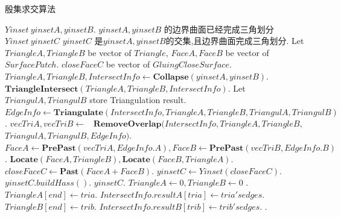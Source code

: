 \documentclass[a4paper]{book}
\renewcommand{\algorithmicrequire}{\textbf{输入:}}
\renewcommand{\algorithmicensure}{\textbf{输出:}}
\renewcommand{\algorithmicrequire}{\textbf{Input : }}
\renewcommand{\algorithmicrequire}{\textbf{Precondition : }}
\renewcommand{\algorithmicensure}{\textbf{Output : }}
\renewcommand{\algorithmicensure}{\textbf{Postcondition : }}
\numberwithin{equation}{chapter}
\theoremstyle{definition}
\begin{document}
\begin{algorithm}  
	\caption{殷集求交算法}  
	\label{alg:1}
	\begin{algorithmic}[1] %
		\renewcommand{\algorithmicrequire}{\textbf{Input : }}
		\Require $Yinset\ yinsetA,yinsetB$.
		\renewcommand{\algorithmicrequire}{\textbf{Precondition : }}
		\Require $yinsetA,yinsetB$ 的边界曲面已经完成三角划分
		\renewcommand{\algorithmicensure}{\textbf{Output : }}
		\Ensure $Yinset\ yinsetC$
		\renewcommand{\algorithmicensure}{\textbf{Postcondition : }}
		\Ensure $yinsetC$ 是$yinsetA,yinsetB$的交集,且边界曲面完成三角划分.
		\State Let $TriangleA,TriangleB$ be vector of $Triangle$, 
		\State $FaceA,FaceB$ be vector of $SurfacePatch$.
		$closeFaceC$ be vector of $GluingCloseSurface$.
		\State $TriangleA,TriangleB,IntersectInfo \gets \textbf{Collapse}(yinsetA,yinsetB)$. 
		\State $\textbf{TriangleIntersect}(TriangleA,TriangleB,IntersectInfo)$.
		\State Let $TriangulA,TriangulB$ store Triangulation  result.
		\State $EdgeInfo \gets \textbf{Triangulate}(IntersectInfo,TriangleA,TriangleB,TriangulA,TriangulB)$.
		\State $vecTriA,vecTriB  \gets $
		\Statex \quad \  $\textbf{RemoveOverlap}(IntersectInfo,TriangleA,TriangleB,$
		$TriangulA,TriangulB,EdgeInfo)$.
		\State $FaceA \gets \textbf{PrePast}(vecTriA,EdgeInfo.A), 
		FaceB \gets \textbf{PrePast}(vecTriB,EdgeInfo.B)$.
		\State $\textbf{Locate}(FaceA,TriangleB),\textbf{Locate}(FaceB,TriangleA)$.
		\State $closeFaceC \gets \textbf{Past}(FaceA + FaceB)$.
		\State $yinsetC \gets Yinset(closeFaceC)$. 
		\State $yinsetC.buildHass()$.
		\State \Return $yinsetC$. 
		\EndFunction
		\State
		\State $TriangleA \gets 0, TriangleB \gets 0$ . 
		\State $TriangleA[end] \gets tria $.
		\State $IntersectInfo.resultA[tria] \gets tria's edges$.
		\State $TriangleB[end] \gets trib$.
		\State $IntersectInfo.resultB[trib] \gets trib's edges$.
		\EndFor
		\EndFor
		\State {}.
		\EndFunction
	\end{algorithmic}
\end{algorithm}
\end{document}
